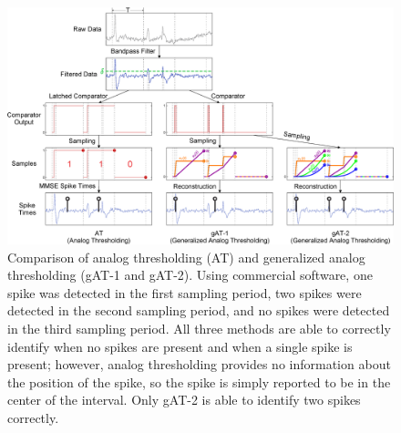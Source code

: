 \documentclass[10 pt]{article}
\begin{document}
\begin{figure}[htbp]
\begin{center}
\includegraphics[scale=0.30]{at_gat.eps}
\caption{Comparison of analog thresholding (AT) and generalized analog thresholding (gAT-1 and gAT-2). Using commercial software, one spike was detected in the first sampling period, two spikes were detected in the second sampling period, and no spikes were detected in the third sampling period. All three methods are able to correctly identify when no spikes are present and when a single spike is present; however, analog thresholding provides no information about the position of the spike, so the spike is simply reported to be in the center of the interval. Only gAT-2 is able to identify two spikes correctly.} %
\label{fig:at_gat}
\end{center}
\end{figure}
\end{document}
